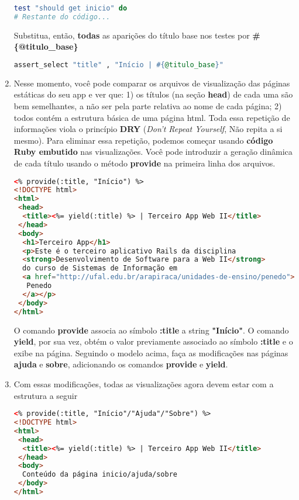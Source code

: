 \documentclass[a4paper,12pt]{article}
\begin{document}
\begin{enumerate}
\begin{lstlisting}[language=Ruby, title={test/controllers/paginas\_estaticas\_controller\_test.rb}]
test "should get inicio" do
# Restante do código...
  \end{lstlisting}

  Substitua, então, \textbf{todas} as aparições do título base nos testes por \textbf{\#\{@titulo\_base\}}

  \begin{lstlisting}[language=Ruby, title={test/controllers/paginas\_estaticas\_controller\_test.rb}]
assert_select "title" , "Início | #{@titulo_base}"
  \end{lstlisting}

  \item Nesse momento, você pode comparar os arquivos de visualização das páginas estáticas do seu app e ver que: 1) os títulos (na seção \textbf{head}) de cada uma são bem semelhantes, a não ser pela parte relativa ao nome de cada página; 2) todos contém a estrutura básica de uma página html. Toda essa repetição de informações viola o princípio \textbf{DRY} (\textit{Don't Repeat Yourself}, Não repita a si mesmo). Para eliminar essa repetição, podemos começar usando \textbf{código Ruby embutido} nas visualizações. Você pode introduzir a geração dinâmica de cada título usando o método \textbf{provide} na primeira linha dos arquivos.

  \begin{lstlisting}[language=html, title=app/views/paginas\_estaticas/inicio.html.erb]
<% provide(:title, "Início") %>
<!DOCTYPE html>
<html>
 <head>
  <title><%= yield(:title) %> | Terceiro App Web II</title>
 </head>
 <body>
  <h1>Terceiro App</h1>
  <p>Este é o terceiro aplicativo Rails da disciplina
  <strong>Desenvolvimento de Software para a Web II</strong>
  do curso de Sistemas de Informação em
  <a href="http://ufal.edu.br/arapiraca/unidades-de-ensino/penedo">
   Penedo
  </a></p>
 </body>
</html>
  \end{lstlisting}

  O comando \textbf{provide} associa ao símbolo \textbf{:title} a string \textbf{"Início"}. O comando \textbf{yield}, por sua vez, obtém o valor previamente associado ao símbolo \textbf{:title} e o exibe na página. Seguindo o modelo acima, faça as modificações nas páginas \textbf{ajuda} e \textbf{sobre}, adicionando os comandos \textbf{provide} e \textbf{yield}.

  \item Com essas modificações, todas as visualizações agora devem estar com a estrutura a seguir

  \begin{lstlisting}[language=html]
<% provide(:title, "Início"/"Ajuda"/"Sobre") %>
<!DOCTYPE html>
<html>
 <head>
  <title><%= yield(:title) %> | Terceiro App Web II</title>
 </head>
 <body>
  Conteúdo da página inicio/ajuda/sobre
 </body>
</html>
  \end{lstlisting}


\end{enumerate}
\end{document}
